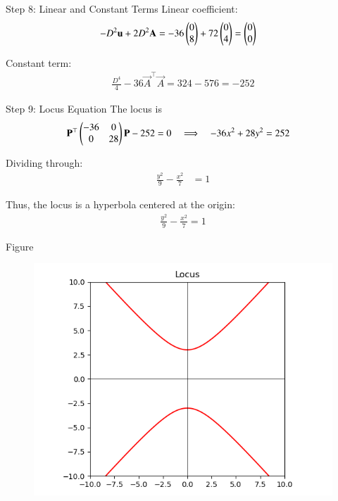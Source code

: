 \documentclass{beamer}
\begin{document}
\begin{frame}{Step 8: Linear and Constant Terms}
Linear coefficient:
\begin{align}
    -D^2\mathbf{u} + 2D^2\mathbf{A} &= -36\begin{pmatrix}0\\8\end{pmatrix} + 72\begin{pmatrix}0\\4\end{pmatrix} = \begin{pmatrix}0\\0\end{pmatrix}
\end{align}

Constant term:
\begin{align}
    \frac{D^4}{4} - 36\vec{A}^\top\vec{A} = 324 - 576 = -252
\end{align}
\end{frame}

\begin{frame}{Step 9: Locus Equation}
The locus is
\begin{align}
    \mathbf{P}^\top\begin{pmatrix}-36 & 0 \\ 0 & 28\end{pmatrix}\mathbf{P} - 252 &= 0
    \quad\Longrightarrow\quad
    -36x^2 + 28y^2 = 252
\end{align}

Dividing through:
\begin{align}
    \frac{y^2}{9} - \frac{x^2}{7} &= 1
\end{align}

Thus, the locus is a hyperbola centered at the origin:
\begin{align}
    \frac{y^2}{9} - \frac{x^2}{7} = 1
\end{align}
\end{frame}
\begin{frame}{Figure}
\begin{figure}[h!]
    \centering
    \includegraphics[height=0.5\textheight, keepaspectratio]{figs/fig.png}
    \label{figure_1}
\end{figure}
\end{frame}
\end{document}

